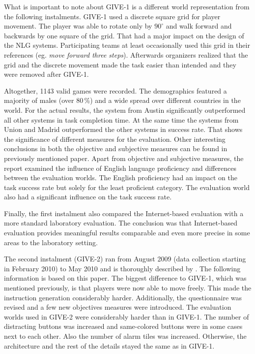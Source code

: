 What is important to note about GIVE-1 is a different world representation from the following instalments. GIVE-1 used a discrete square grid for player movement. The player was able to rotate only by $90^{\circ}$ and walk forward and backwards by one square of the grid. That had a major impact on the design of the NLG systems. Participating teams at least occasionally used this grid in their references (eg. \textit{move forward three steps}). Afterwards organizers realized that the grid and the discrete movement made the task easier than intended and they were removed after GIVE-1.

Altogether, 1143 valid games were recorded. The demographics featured a majority of males (over 80\,\%) and a wide spread over different countries in the world. For the actual results,  the system from Austin significantly outperformed all other systems in task completion time. At the same time the systems from Union and Madrid outperformed the other systems in success rate. That shows the significance of different measures for the evaluation. Other interesting conclusions in both the objective and subjective measures can be found in previously mentioned paper. Apart from objective and subjective measures, the report examined the influence of English language proficiency and differences between the evaluation worlds. The English proficiency had an impact on the task success rate but solely for the least proficient category. The evaluation world also had a significant influence on the task success rate.

Finally, the first instalment also compared the Internet-based evaluation with a more standard laboratory evaluation. The conclusion was that Internet-based evaluation provides meaningful results comparable and even more precise in some areas to the laboratory setting.

The second instalment (GIVE-2) ran from August 2009 (data collection starting in February 2010) to May 2010 and is thoroughly described by \citet{koller2010report}. The following information is based on this paper. The biggest difference to GIVE-1, which was mentioned previously, is that players were now able to move freely. This made the instruction generation considerably harder. Additionally, the questionnaire was revised and a few new objectives measures were introduced. The evaluation worlds used in GIVE-2 were considerably harder than in GIVE-1. The number of distracting buttons was increased and same-colored buttons were in some cases next to each other. Also the number of alarm tiles was increased. Otherwise, the architecture and the rest of the details stayed the same as in GIVE-1.

